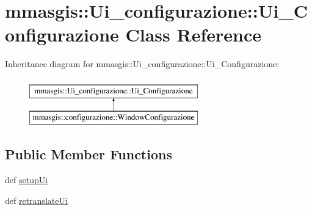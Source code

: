 \hypertarget{classmmasgis_1_1Ui__configurazione_1_1Ui__Configurazione}{
\section{mmasgis::Ui\_\-configurazione::Ui\_\-Configurazione Class Reference}
\label{classmmasgis_1_1Ui__configurazione_1_1Ui__Configurazione}
}
Inheritance diagram for mmasgis::Ui\_\-configurazione::Ui\_\-Configurazione:\begin{figure}[H]
\begin{center}
\leavevmode
\includegraphics[height=2.000000cm]{classmmasgis_1_1Ui__configurazione_1_1Ui__Configurazione}
\end{center}
\end{figure}
\subsection*{Public Member Functions}
\begin{DoxyCompactItemize}
\item 
def \hyperlink{classmmasgis_1_1Ui__configurazione_1_1Ui__Configurazione_a50505df8ea8c73d448866ebd830d8841}{setupUi}
\item 
def \hyperlink{classmmasgis_1_1Ui__configurazione_1_1Ui__Configurazione_afcd9784fd4f52bb4cdb700b02bde6cde}{retranslateUi}
\end{DoxyCompactItemize}
